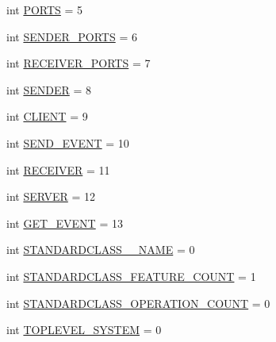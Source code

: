 \begin{DoxyCompactItemize}
\item 
int \hyperlink{interfaceshootingmachineemfmodel_1_1_shootingmachineemfmodel_package_a18bf82e2b562ca96327f1cb2b4a5e990}{P\-O\-R\-T\-S} = 5
\item 
int \hyperlink{interfaceshootingmachineemfmodel_1_1_shootingmachineemfmodel_package_a7daade5e29330373c428f1ec50fd984b}{S\-E\-N\-D\-E\-R\-\_\-\-P\-O\-R\-T\-S} = 6
\item 
int \hyperlink{interfaceshootingmachineemfmodel_1_1_shootingmachineemfmodel_package_ad41eaba854eca734766639cd163028bc}{R\-E\-C\-E\-I\-V\-E\-R\-\_\-\-P\-O\-R\-T\-S} = 7
\item 
int \hyperlink{interfaceshootingmachineemfmodel_1_1_shootingmachineemfmodel_package_a249e6702143a85bb37cc88a615e3e085}{S\-E\-N\-D\-E\-R} = 8
\item 
int \hyperlink{interfaceshootingmachineemfmodel_1_1_shootingmachineemfmodel_package_a1c00701cdfb4ee9e77a8d05edc4c89ed}{C\-L\-I\-E\-N\-T} = 9
\item 
int \hyperlink{interfaceshootingmachineemfmodel_1_1_shootingmachineemfmodel_package_ab3c45188557a3e09f02d1f1e98ec9007}{S\-E\-N\-D\-\_\-\-E\-V\-E\-N\-T} = 10
\item 
int \hyperlink{interfaceshootingmachineemfmodel_1_1_shootingmachineemfmodel_package_a4bedda5960870baa89368b22282164bc}{R\-E\-C\-E\-I\-V\-E\-R} = 11
\item 
int \hyperlink{interfaceshootingmachineemfmodel_1_1_shootingmachineemfmodel_package_a508642504c7001bdf5fa4f23a286b880}{S\-E\-R\-V\-E\-R} = 12
\item 
int \hyperlink{interfaceshootingmachineemfmodel_1_1_shootingmachineemfmodel_package_a455c42983e7a26435593b1a895505a0f}{G\-E\-T\-\_\-\-E\-V\-E\-N\-T} = 13
\item 
int \hyperlink{interfaceshootingmachineemfmodel_1_1_shootingmachineemfmodel_package_a06475d7d54d52ee19b2aaf4d5d73c738}{S\-T\-A\-N\-D\-A\-R\-D\-C\-L\-A\-S\-S\-\_\-\-\_\-\-N\-A\-M\-E} = 0
\item 
int \hyperlink{interfaceshootingmachineemfmodel_1_1_shootingmachineemfmodel_package_a14037f66989b3107e402142df96ee9aa}{S\-T\-A\-N\-D\-A\-R\-D\-C\-L\-A\-S\-S\-\_\-\-F\-E\-A\-T\-U\-R\-E\-\_\-\-C\-O\-U\-N\-T} = 1
\item 
int \hyperlink{interfaceshootingmachineemfmodel_1_1_shootingmachineemfmodel_package_a2fe5d848cfe0a02fe5609e2c5ed7e7c7}{S\-T\-A\-N\-D\-A\-R\-D\-C\-L\-A\-S\-S\-\_\-\-O\-P\-E\-R\-A\-T\-I\-O\-N\-\_\-\-C\-O\-U\-N\-T} = 0
\item 
int \hyperlink{interfaceshootingmachineemfmodel_1_1_shootingmachineemfmodel_package_a035b0cce452e9b05e1d638365d50e5ee}{T\-O\-P\-L\-E\-V\-E\-L\-\_\-\-S\-Y\-S\-T\-E\-M} = 0

\end{DoxyCompactItemize}

